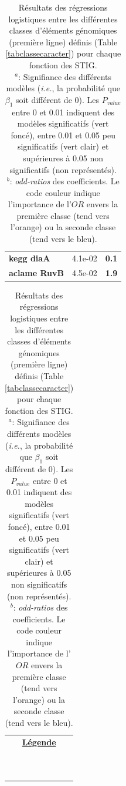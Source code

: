 \begin{landscape}
\begin{table}
{\begin{minipage}[t]{0.3\textwidth}
\begin{tabular}{>{\bfseries}p{\textwidth}cc}
\rowcolor{posit2}kegg diaA&4.1e-02&\textbf{\colorbox{colorpowernegxx}{0.1}}\\
\rowcolor{posit2}aclame RuvB&4.5e-02&\textbf{\colorbox{colorpower}{1.9}}\\
	\end{tabular}
	\begin{tabular}{@{\hspace{4cm}}>{\huge}c}
	\\[10cm]
	\textbf{\underline{Légende}}\\[0.8cm]
	\colorbox{colorpowerxxxx}{\makebox[5cm]{$e^{4}<OR$}}\\
	\colorbox{colorpowerxxx}{\makebox[5cm]{$e^{3}<OR<e^{4}$}}\\
	\colorbox{colorpowerxx}{\makebox[5cm]{$e^{2}<OR<e^{3}$}}\\
	\colorbox{colorpowerx}{\makebox[5cm]{$e^{1}<OR<e^{2}$}}\\
	\colorbox{colorpower}{\makebox[5cm]{$e^{0}<OR<e^{1}$}}\\
	\colorbox{colorpowerneg}{\makebox[5cm]{$e^{-1}<OR<e^{0}$}}\\
	\colorbox{colorpowernegx}{\makebox[5cm]{$e^{-2}<OR<e^{-1}$}}\\
	\colorbox{colorpowernegxx}{\makebox[5cm]{$e^{-3}<OR<e^{-2}$}}\\
	\colorbox{colorpowernegxxx}{\makebox[5cm]{$e^{-4}<OR<e^{-3}$}}\\
	\colorbox{colorpowernegxxxx}{\makebox[5cm]{$OR<e^{-4}$}}\\
	\end{tabular}
	\end{minipage}}
		\hspace*{-3cm}
	\begin{minipage}{2\textwidth}
	\hspace*{-3cm}
	\captionsetup{justification = justified}
	\caption[Résultats des régressions logistiques entre les différentes classes d'éléments génomiques]{ Résultats des régressions logistiques entre les différentes classes d'éléments génomiques (première ligne) définis (Table \ref{tabclassecaracter}) pour chaque fonction des STIG.\\
	\footnotesize\medskip $^{a}$: Signifiance des différents modèles (\textit{i.e.}, la probabilité que $\beta_{1}$ soit différent de 0). Les $P_{value}$ entre 0 et 0.01 indiquent des modèles significatifs (vert foncé), entre 0.01 et 0.05 peu significatifs (vert clair) et supérieures à 0.05 non significatifs (non représentés). \\ $^{b}$: \textit{odd-ratios} des coefficients. Le code couleur indique l'importance de l'$OR$ envers la première classe (tend vers l'orange) ou la seconde classe (tend vers le bleu). }\label{tabreglogis}
	\captionsetup{}
		\end{minipage}
\end{table}

\end{landscape}
			
